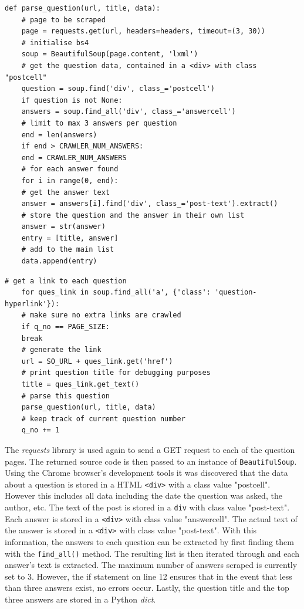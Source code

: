 \documentclass[12pt,a4paper]{article}
\newcommand{\captionstyle}[1] {
    \small{#1}
}
\begin{document}
\begin{minipage}{\columnwidth}
	\begin{lstlisting}[caption={\captionstyle{Extracting answers for a specific Stack Overflow question.}}, label={lst:extract-answers}]
	def parse_question(url, title, data):
	# page to be scraped
	page = requests.get(url, headers=headers, timeout=(3, 30))
	# initialise bs4
	soup = BeautifulSoup(page.content, 'lxml')
	# get the question data, contained in a <div> with class "postcell"
	question = soup.find('div', class_='postcell')
	if question is not None:
	answers = soup.find_all('div', class_='answercell')
	# limit to max 3 answers per question
	end = len(answers)
	if end > CRAWLER_NUM_ANSWERS:
	end = CRAWLER_NUM_ANSWERS
	# for each answer found
	for i in range(0, end):
	# get the answer text
	answer = answers[i].find('div', class_='post-text').extract()
	# store the question and the answer in their own list
	answer = str(answer)
	entry = [title, answer]
	# add to the main list
	data.append(entry)
	\end{lstlisting}
\end{minipage}

\begin{minipage}{\linewidth}
	\begin{lstlisting}[caption={\captionstyle{Extracting the URL of each question on a Stack Overflow page.}}, label={lst:extract-questions}]
	# get a link to each question
	for ques_link in soup.find_all('a', {'class': 'question-hyperlink'}):
	# make sure no extra links are crawled
	if q_no == PAGE_SIZE:
	break
	# generate the link
	url = SO_URL + ques_link.get('href')
	# print question title for debugging purposes
	title = ques_link.get_text()
	# parse this question
	parse_question(url, title, data)
	# keep track of current question number
	q_no += 1
	\end{lstlisting}
\end{minipage}

The \textit{requests} library is used again to send a GET request to each of the question pages. The returned source code is then passed to an instance of \texttt{BeautifulSoup}. Using the Chrome browser's development tools it was discovered that the data about a question is stored in a HTML \texttt{<div>} with a class value "postcell". However this includes all data including the date the question was asked, the author, etc. The text of the post is stored in a \texttt{div} with class value "post-text". Each answer is stored in a \texttt{<div>} with class value "answercell". The actual text of the answer is stored in a \texttt{<div>} with class value "post-text". With this information, the answers to each question can be extracted by first finding them with the \texttt{find\_all()} method. The resulting list is then iterated through and each answer's text is extracted. The maximum number of answers scraped is currently set to 3. However, the if statement on line 12 ensures that in the event that less than three answers exist, no errors occur. Lastly, the question title and the top three answers are stored in a Python \textit{dict}.
\end{document}
